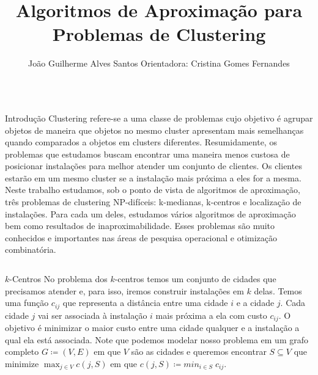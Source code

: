\documentclass[final]{beamer}
\title{Algoritmos de Aproximação para Problemas de Clustering}
\author{João Guilherme Alves Santos \hspace{100pt} Orientadora: Cristina Gomes Fernandes}
\institute{\vspace{10pt}Departamento de Ciência da Computação,
Instituto de Matemática e Estatística, Universidade de São Paulo}
\begin{document}
\begin{frame}[t]
\begin{columns}[t] %
\begin{column}{.9\paperwidth}%

	\begin{alertblock}{Introdução}
    Clustering refere-se a uma classe de problemas cujo objetivo é agrupar objetos de maneira que objetos no mesmo cluster apresentam mais semelhanças quando comparados a objetos em clusters diferentes. Resumidamente, os problemas que estudamos buscam encontrar uma maneira menos custosa de posicionar instalações para melhor atender um conjunto de clientes. Os clientes estarão em um mesmo cluster se a instalação mais próxima a eles for a mesma. Neste trabalho estudamos, sob o ponto de vista de algoritmos de aproximação, três problemas de clustering NP-difíceis: k-medianas, k-centros e localização de instalações. Para cada um deles, estudamos vários algoritmos de aproximação bem como resultados de inaproximabilidade. Esses problemas são muito conhecidos e importantes nas áreas de pesquisa operacional e otimização combinatória.
    \end{alertblock}

    \end{column}
\end{columns}

\begin{columns}[t]

  \begin{column}{0.47\paperwidth}
    \begin{block}{$k$-Centros}
      No problema dos $k$-centros temos um conjunto de cidades que precisamos atender e, para isso, iremos construir instalações em $k$ delas. Temos uma função $c_{ij}$ que representa a distância entre uma cidade $i$ e a cidade $j$. Cada cidade $j$ vai ser associada à instalação $i$ mais próxima a ela com custo $c_{ij}$. O objetivo é minimizar o maior custo entre uma cidade qualquer e a instalação a qual ela está associada. Note que podemos modelar nosso problema em um grafo completo $G \coloneqq (V,E)$ em que $V$ são as cidades e queremos encontrar $ S \subseteq V$ que minimize $\max_{j \in V} c(j,S)$ em que $c(j,S)\coloneqq min_{i\in S} \; c_{ij}$.


\end{block}
\end{column}
\end{columns}
\end{frame}
\end{document}
